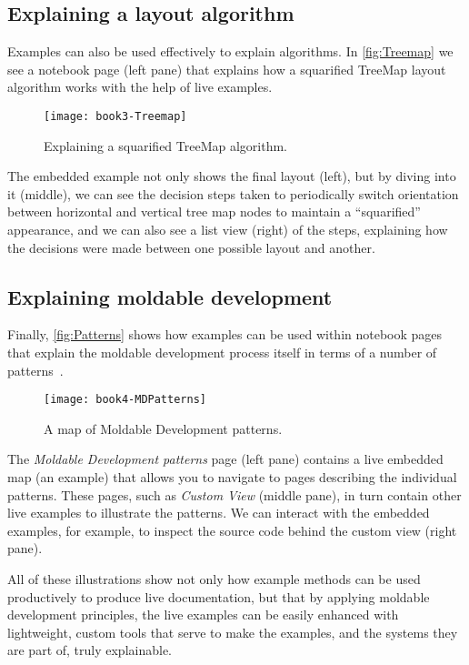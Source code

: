 \documentclass[acmsmall,screen,authorversion,nonacm]{acmart} %
\begin{document}
\subsection{Explaining a layout algorithm}
Examples can also be used effectively to explain algorithms.
In \autoref{fig:Treemap} we see a notebook page (left pane) that explains how a squarified TreeMap layout algorithm works with the help of live examples.
\begin{figure}[h]
  \texttt{[image: book3-Treemap]}
  \caption{Explaining a squarified TreeMap algorithm.}
  \label{fig:Treemap}
\end{figure}
The embedded example not only shows the final layout (left), but by diving into it (middle), we can see the decision steps taken to periodically switch orientation between horizontal and vertical tree map nodes to maintain a ``squarified'' appearance, and we can also see a list view (right) of the steps, explaining how the decisions were made between one possible layout and another.

\subsection{Explaining moldable development}
Finally, \autoref{fig:Patterns} shows how examples can be used within notebook pages that explain the moldable development process itself in terms of a number of patterns~\cite{Nier24a}.
\begin{figure}[h]
  \texttt{[image: book4-MDPatterns]}
  \caption{A map of Moldable Development patterns.}
  \label{fig:Patterns}
\end{figure}
The \emph{Moldable Development patterns} page (left pane) contains a live embedded map (an example) that allows you to navigate to pages describing the individual patterns.
These pages, such as \emph{Custom View} (middle pane), in turn contain other live examples to illustrate the patterns.
We can interact with the embedded examples, for example, to inspect the source code behind the custom view (right pane).

All of these illustrations show not only how example methods can be used productively to produce live documentation, but that by applying moldable development principles, the live examples can be easily enhanced with lightweight, custom tools that serve to make the examples, and the systems they are part of, truly explainable.
\end{document}
